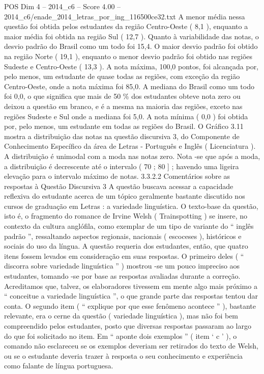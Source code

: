 \begin{textsample}{POS Dim 4 – 2014\_c6 – Score 4.00 – 2014\_c6/enade\_2014\_letras\_por\_ing\_116500ce32.txt}
A menor média nessa questão foi obtida pelos estudantes da região Centro-Oeste ( 8,1 ), enquanto a maior média foi obtida na região Sul ( 12,7 ).
Quanto à variabilidade das notas, o desvio padrão do Brasil como um todo foi 15,4.
O maior desvio padrão foi obtido na região Norte ( 19,1 ), enquanto o menor desvio padrão foi obtido nas regiões Sudeste e Centro-Oeste ( 13,3 ).
A nota máxima, 100,0 pontos, foi alcançada por, pelo menos, um estudante de quase todas as regiões, com exceção da região Centro-Oeste, onde a nota máxima foi 85,0.
A mediana do Brasil como um todo foi 0,0, o que significa que mais de 50 \% dos estudantes obteve nota zero ou deixou a questão em branco, e é a mesma na maioria das regiões, exceto nas regiões Sudeste e Sul onde a mediana foi 5,0.
A nota mínima ( 0,0 ) foi obtida por, pelo menos, um estudante em todas as regiões do Brasil.
O Gráfico 3.11 mostra a distribuição das notas na questão discursiva 3, do Componente de Conhecimento Específico da área de Letras - Português e Inglês ( Licenciatura ).
A distribuição é unimodal com a moda nas notas zero.
Nota -se que após a moda, a distribuição é decrescente até o intervalo ( 70 ; 80 ] ; havendo uma ligeira elevação para o intervalo máximo de notas. 3.3.2.2 Comentários sobre as respostas à Questão Discursiva 3 A questão buscava acessar a capacidade reflexiva do estudante acerca de um tópico geralmente bastante discutido nos cursos de graduação em Letras : a variedade linguística.
O texto-base da questão, isto é, o fragmento do romance de Irvine Welsh ( Trainspotting ) se insere, no contexto da cultura anglófila, como exemplar de um tipo de variante do “ inglês padrão ”, ressaltando aspectos regionais, nacionais ( escoceses ), históricos e sociais do uso da língua.
A questão requeria dos estudantes, então, que quatro itens fossem levados em consideração em suas respostas.
O primeiro deles ( “ discorra sobre variedade linguística ” ) mostrou -se um pouco impreciso aos estudantes, tomando -se por base as respostas avaliadas durante a correção.
Acreditamos que, talvez, os elaboradores tivessem em mente algo mais próximo a “ conceitue a variedade linguística ”, o que grande parte das respostas tentou dar conta.
O segundo item ( “ explique por que esse fenômeno acontece ” ), bastante relevante, era o cerne da questão ( variedade linguística ), mas não foi bem compreendido pelos estudantes, posto que diversas respostas passaram ao largo do que foi solicitado no item.
Em “ aponte dois exemplos ” ( item ‘ c ’ ), o comando não esclareceu se os exemplos deveriam ser retirados do texto de Welsh, ou se o estudante deveria trazer à resposta o seu conhecimento e experiência como falante de língua portuguesa.

\end{textsample}
